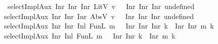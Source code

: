 \begin{isabellebody}
\ \ \ \ {\isachardoublequoteopen}selectImplAux\ {\isacharparenleft}{\kern0pt}Inr\ {\isacharparenleft}{\kern0pt}Inr\ {\isacharparenleft}{\kern0pt}Inr\ {\isacharparenleft}{\kern0pt}LitV{}\ v{\isacharparenright}{\kern0pt}{\isacharparenright}{\kern0pt}{\isacharparenright}{\kern0pt}{\isacharparenright}{\kern0pt}\ {\isacharunderscore}{\kern0pt}\ {\isacharequal}{\kern0pt}\ {\isacharparenleft}{\kern0pt}Inr\ {\isacharparenleft}{\kern0pt}Inr\ {\isacharparenleft}{\kern0pt}Inr\ undefined{\isacharparenright}{\kern0pt}{\isacharparenright}{\kern0pt}{\isacharparenright}{\kern0pt}{\isachardoublequoteclose}\isanewline
\ \ {\isacharbar}{\kern0pt}\ {\isachardoublequoteopen}selectImplAux\ {\isacharparenleft}{\kern0pt}Inr\ {\isacharparenleft}{\kern0pt}Inr\ {\isacharparenleft}{\kern0pt}Inr\ {\isacharparenleft}{\kern0pt}AbsV{}\ v{\isacharparenright}{\kern0pt}{\isacharparenright}{\kern0pt}{\isacharparenright}{\kern0pt}{\isacharparenright}{\kern0pt}\ {\isacharunderscore}{\kern0pt}\ {\isacharequal}{\kern0pt}\ {\isacharparenleft}{\kern0pt}Inr\ {\isacharparenleft}{\kern0pt}Inr\ {\isacharparenleft}{\kern0pt}Inr\ undefined{\isacharparenright}{\kern0pt}{\isacharparenright}{\kern0pt}{\isacharparenright}{\kern0pt}{\isachardoublequoteclose}\isanewline
\ \ {\isacharbar}{\kern0pt}\ {\isachardoublequoteopen}selectImplAux\ {\isacharparenleft}{\kern0pt}Inr\ {\isacharparenleft}{\kern0pt}Inr\ {\isacharparenleft}{\kern0pt}Inl\ {\isacharparenleft}{\kern0pt}FunL\ m\ {\isacharunderscore}{\kern0pt}\ {\isacharunderscore}{\kern0pt}{\isacharparenright}{\kern0pt}{\isacharparenright}{\kern0pt}{\isacharparenright}{\kern0pt}{\isacharparenright}{\kern0pt}\ {\isacharparenleft}{\kern0pt}Inr\ {\isacharparenleft}{\kern0pt}Inr\ {\isacharparenleft}{\kern0pt}Inr\ k{\isacharparenright}{\kern0pt}{\isacharparenright}{\kern0pt}{\isacharparenright}{\kern0pt}\ {\isacharequal}{\kern0pt}\ Inr\ {\isacharparenleft}{\kern0pt}Inr\ {\isacharparenleft}{\kern0pt}m\ k{\isacharparenright}{\kern0pt}{\isacharparenright}{\kern0pt}{\isachardoublequoteclose}\isanewline
\ \ {\isacharbar}{\kern0pt}\ {\isachardoublequoteopen}selectImplAux\ {\isacharparenleft}{\kern0pt}Inr\ {\isacharparenleft}{\kern0pt}Inl\ {\isacharparenleft}{\kern0pt}FunL\ m\ {\isacharunderscore}{\kern0pt}\ {\isacharunderscore}{\kern0pt}{\isacharparenright}{\kern0pt}{\isacharparenright}{\kern0pt}{\isacharparenright}{\kern0pt}\ {\isacharparenleft}{\kern0pt}Inr\ {\isacharparenleft}{\kern0pt}Inr\ k{\isacharparenright}{\kern0pt}{\isacharparenright}{\kern0pt}\ {\isacharequal}{\kern0pt}\ Inr\ {\isacharparenleft}{\kern0pt}m\ k{\isacharparenright}{\kern0pt}{\isachardoublequoteclose}\isanewline

\end{isabellebody}
